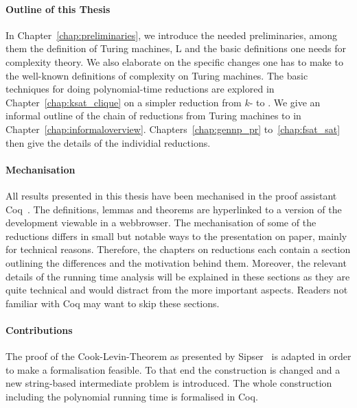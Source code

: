 \paragraph{Outline of this Thesis}
In Chapter~\ref{chap:preliminaries}, we introduce the needed preliminaries, among them the definition of Turing machines, L and the basic definitions one needs for complexity theory. We also elaborate on the specific changes one has to make to the well-known definitions of complexity on Turing machines.
The basic techniques for doing polynomial-time reductions are explored in Chapter~\ref{chap:ksat_clique} on a simpler reduction from $k$-\SAT{} to \Clique{}.
We give an informal outline of the chain of reductions from Turing machines to \SAT{} in Chapter~\ref{chap:informaloverview}. 
Chapters~\ref{chap:gennp_pr} to~\ref{chap:fsat_sat} then give the details of the individial reductions.

\paragraph{Mechanisation}
All results presented in this thesis have been mechanised in the proof assistant Coq~\cite{coqweb}. The definitions, lemmas and theorems are hyperlinked to a version of the development viewable in a webbrowser.
The mechanisation of some of the reductions differs in small but notable ways to the presentation on paper, mainly for technical reasons. 
Therefore, the chapters on reductions each contain a section outlining the differences and the motivation behind them. 
Moreover, the relevant details of the running time analysis will be explained in these sections as they are quite technical and would distract from the more important aspects.
Readers not familiar with Coq may want to skip these sections.

\paragraph{Contributions}
The proof of the Cook-Levin-Theorem as presented by Sipser~\cite{Sipser:TheoryofComputation} is adapted in order to make a formalisation feasible. To that end the construction is changed and a new string-based intermediate problem is introduced. 
The whole construction including the polynomial running time is formalised in Coq.





